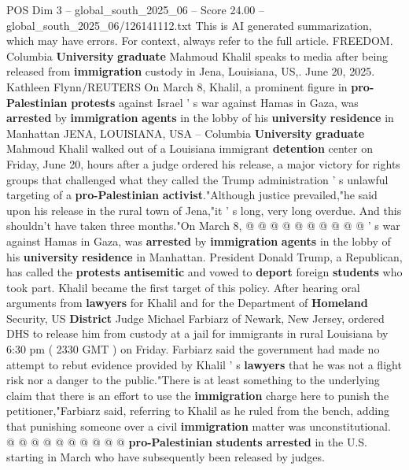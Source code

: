 \begin{textsample}{POS Dim 3 – global\_south\_2025\_06 – Score 24.00 – global\_south\_2025\_06/126141112.txt}  \label{ex:f3_pos_189}
This is AI generated summarization, which may have errors.
For context, always refer to the full article.
FREEDOM.
Columbia \textbf{University} \textbf{graduate} Mahmoud Khalil speaks to media after being released from \textbf{immigration} custody in Jena, Louisiana, US,.
June 20, 2025.
Kathleen Flynn/REUTERS On March 8, Khalil, a prominent figure in \textbf{pro-Palestinian} \textbf{protests} against Israel ' s war against Hamas in Gaza, was \textbf{arrested} by \textbf{immigration} \textbf{agents} in the lobby of his \textbf{university} \textbf{residence} in Manhattan JENA, LOUISIANA, USA -- Columbia \textbf{University} \textbf{graduate} Mahmoud Khalil walked out of a Louisiana immigrant \textbf{detention} center on Friday, June 20, hours after a judge ordered his release, a major victory for rights groups that challenged what they called the Trump administration ' s unlawful targeting of a \textbf{pro-Palestinian} \textbf{activist}."Although justice prevailed,"he said upon his release in the rural town of Jena,"it ' s long, very long overdue.
And this shouldn't have taken three months."On March 8, @ @ @ @ @ @ @ @ @ @ ' s war against Hamas in Gaza, was \textbf{arrested} by \textbf{immigration} \textbf{agents} in the lobby of his \textbf{university} \textbf{residence} in Manhattan.
President Donald Trump, a Republican, has called the \textbf{protests} \textbf{antisemitic} and vowed to \textbf{deport} foreign \textbf{students} who took part.
Khalil became the first target of this policy.
After hearing oral arguments from \textbf{lawyers} for Khalil and for the Department of \textbf{Homeland} Security, US \textbf{District} Judge Michael Farbiarz of Newark, New Jersey, ordered DHS to release him from custody at a jail for immigrants in rural Louisiana by 6:30 pm ( 2330 GMT ) on Friday.
Farbiarz said the government had made no attempt to rebut evidence provided by Khalil ' s \textbf{lawyers} that he was not a flight risk nor a danger to the public."There is at least something to the underlying claim that there is an effort to use the \textbf{immigration} charge here to punish the petitioner,"Farbiarz said, referring to Khalil as he ruled from the bench, adding that punishing someone over a civil \textbf{immigration} matter was unconstitutional. @ @ @ @ @ @ @ @ @ @ \textbf{pro-Palestinian} \textbf{students} \textbf{arrested} in the U.S. starting in March who have subsequently been released by judges.

\end{textsample}
